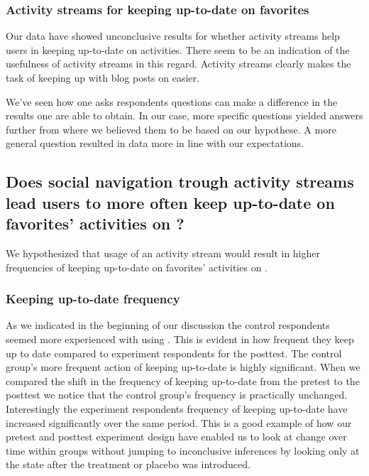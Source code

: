\subsubsection{Activity streams for keeping up-to-date on favorites}

Our data have showed unconclusive results for whether activity
streams help users in keeping up-to-date on activities. There seem to be an
indication of the usefulness of activity streams in this regard.
Activity streams clearly makes the task of keeping up with blog posts on
\urort{} easier.

We've seen how
one asks respondents questions can make a difference in the results one
are able to obtain. In our case, more specific questions yielded answers
further from where we believed them to be based on our hypothese. A more
general question resulted in data more in line with our expectations.

\subsection{%
  Does social navigation trough activity streams lead users to more often keep
  up-to-date on favorites' activities on \urort{}?
}

We hypothesized that usage of an activity stream would result in higher
frequencies of keeping up-to-date on favorites' activities on \urort{}.

\subsubsection{Keeping up-to-date frequency}

As we indicated in the beginning of our discussion the control respondents
seemed more experienced with using \urort{}. This is evident in how
frequent they keep up to date compared to experiment respondents for the
posttest.%
The control group's more frequent action of keeping up-to-date is highly
significant. When we compared the shift in the frequency of keeping up-to-date
from the pretest to the posttest%
we notice that the control group's frequency is practically unchanged.
Interestingly the experiment respondents frequency of keeping up-to-date have
increased significantly over the same period. This is a good example
of how our pretest and posttest experiment design have enabled us to look
at change over time within groups without jumping to inconclusive inferences
by looking only at the state after the treatment or placebo was introduced.


